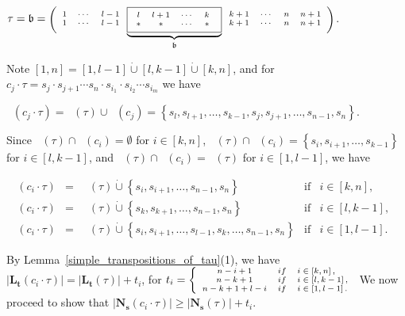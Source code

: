 \documentclass[a4 paper,12pt]{article}
\newcommand{\ger}[1]{\mathfrak{#1}}
\DeclareMathOperator{\Red}{R_{\textbf{d}}}
\begin{document}
 \begin{center}
 $\tau = \ger{b} = \begin{scriptsize}\Bigg(
 \begin{array}{ccc}
	1 & \cdots & l -1 \\
	1&\cdots&  l -1
\end{array}
\underbrace{\framebox{$
\begin{array}{cccc}
	l & l+1 & \cdots &k \\
	\ast & \ast & \cdots &\ast
\end{array}$
}}_{\ger{b}}
\begin{array}{ccc}
	k+1 & \cdots & n\\
	k+1 & \cdots & n
\end{array}
\begin{array}{c}
	n+1\\
	n+1
\end{array} \Bigg)\end{scriptsize}$. 
\end{center}
 Note  $\left[1,n\right] =\left[1,l-1\right] \dot{\cup}  \left[l,k-1\right] \dot{\cup}  \left[k,n\right]$, and  for $c_j\cdot \tau = s_{j}\cdot s_{j+1}\cdots s_{n} \cdot s_{i_1}\cdot s_{i_2} \cdots s_{i_m}$ we have
\begin{center}
$\Red(c_j\cdot \tau) = \Red(\tau) \cup \Red(c_j) = \left\{s_{l}, s_{l+1} ,\ldots , s_{k-1}, s_{j},s_{j+1}, \ldots , s_{n-1}, s_{n}\right\}$.
\end{center}
 Since $\Red(\tau)\cap \Red(c_i) =\emptyset$ for $i\in\left[k,n\right] $,  $\Red(\tau)\cap \Red(c_i) =\left\{s_{i}, s_{i+1} ,\ldots , s_{k-1}\right\}$ for $i\in\left[l,k-1\right] $,  and  $\Red(\tau)\cap \Red(c_i) =\Red(\tau)$ for $i\in\left[1,l-1\right]$, we have
\begin{center}
$
\begin{array}{cclcl}
	\Red(c_i\cdot \tau)& =& \Red(\tau) \dot{\cup} \left\{s_{i},s_{i+1}, \ldots , s_{n-1}, s_{n}\right\}  & \textrm{if} & i\in\left[k,n\right],\\[1mm]
	\Red(c_i\cdot \tau)& =& \Red(\tau) \dot{\cup} \left\{ s_{k},s_{k+1}, \ldots , s_{n-1}, s_{n}\right\}  & \textrm{if} & i\in\left[l,k-1\right],\\[1mm]
	\Red(c_i\cdot \tau)& =& \Red(\tau) \dot{\cup} \left\{s_{i},s_{i+1}, \ldots ,   s_{l-1}, s_{k},\ldots , s_{n-1}, s_{n}\right\}  & \textrm{if} & i\in\left[1,l-1\right].
\end{array}
$
\end{center}
By Lemma~\ref{simple_transpositions_of_tau}(1),   we have   $\left|\textbf{L}_{\textbf{t}}(c_i\cdot \tau)\right| =  \left|\textbf{L}_{\textbf{t}}( \tau)\right| +t_i$,  for  $t_i= \begin{scriptsize}\left\{
\begin{array}{ccl}
	n-i+1& if & i\in \left[k,n\right],\\
	n-k+1 &if& i\in \left[l,k-1\right],\\
	n-k +1 +l-i &if & i\in \left[1,l-1\right].
\end{array}
\right.\end{scriptsize}$ We now proceed to show that $\left|\textbf{N}_{\textbf{s}}(c_i\cdot \tau)\right| \geq   \left|\textbf{N}_{\textbf{s}}( \tau)\right| +t_i$.
\end{document}
